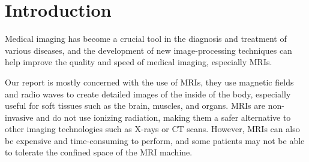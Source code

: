 \chapter{Introduction}
\ifpdf
    \graphicspath{{Introduction/IntroductionFigs/PNG/}{Introduction/IntroductionFigs/PDF/}{Introduction/IntroductionFigs/}}
\else
    \graphicspath{{Introduction/IntroductionFigs/EPS/}{Introduction/IntroductionFigs/}}
\fi

Medical imaging has become a crucial tool in the diagnosis and treatment of various diseases, and the development of new image-processing techniques can help improve the quality and speed of medical imaging, especially MRIs.\\


Our report is mostly concerned with the use of MRIs, they use magnetic fields and radio waves to create detailed images of the inside of the body, especially useful for soft tissues such as the brain, muscles, and organs. MRIs are non-invasive and do not use ionizing radiation, making them a safer alternative to other imaging technologies such as X-rays or CT scans. However, MRIs can also be expensive and time-consuming to perform, and some patients may not be able to tolerate the confined space of the MRI machine.\\

